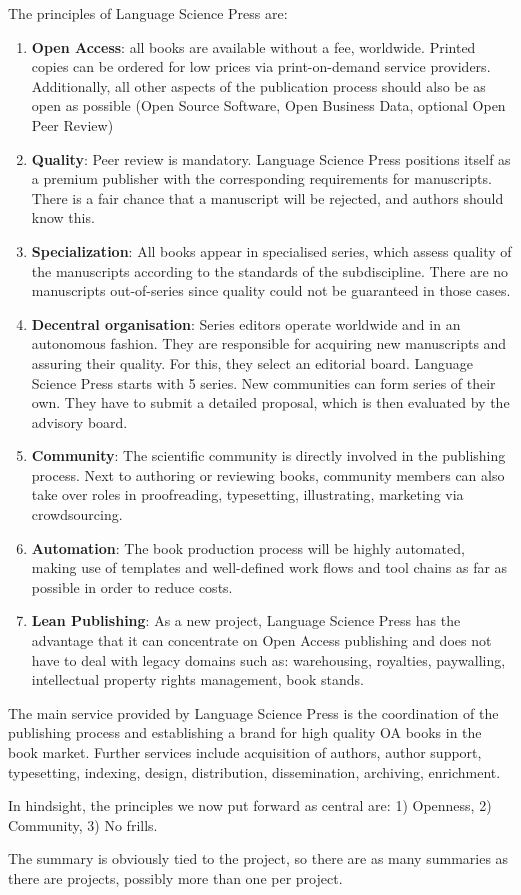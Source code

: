 \documentclass[nonflat,smallfont
]{langsci/langscibook}
\newcommand{\evaluation}[1]{
  \renewcommand{\tblslinecolour}{lsLightOrange}
  \tblssy{receipt}{Evaluation}{\vspace*{-5mm}#1}
}
\newcommand{\othersolutions}[1]{
  \renewcommand{\tblslinecolour}{lsDarkGreenOne}
  \tblssy{more}{Other solutions}{\vspace*{-5mm}#1}
}
\renewcommand{\tblssy}[4][black!12]{%
  \renewcommand{\langscisymbol}{#2}\renewcommand{\tblsboxcolor}{#1}
  \begin{mdframed}[style=yellowexercise,frametitle={#3}]
    #4
  \end{mdframed}
}
\begin{document}
{The principles of Language Science Press are: 
\begin{enumerate}
\sloppy
 \item \textbf{Open Access}: all books are available without a fee, worldwide. Printed copies can be ordered for low prices via print-on-demand service providers. Additionally, all other aspects of the publication process should also be as open as possible (Open Source Software, Open Business Data, optional Open Peer Review)
 \item \textbf{Quality}: Peer review is mandatory. Language Science Press positions itself as a premium publisher with the corresponding requirements for manuscripts. There is a fair chance that a manuscript will be rejected, and authors should know this. 
 \item \textbf{Specialization}: All books appear in specialised series, which assess quality of the manuscripts according to the standards of the subdiscipline. There are no manuscripts out-of-series since quality could not be guaranteed in those cases. 
 \item \textbf{Decentral organisation}: Series editors operate worldwide and in an autonomous fashion. They are responsible for acquiring new manuscripts and assuring their quality. For this, they select an editorial board. Language Science Press starts with 5 series. New communities can form series of their own. They have to submit a detailed proposal, which is then evaluated by the advisory board. 
 \item \textbf{Community}: The scientific community is directly involved in the publishing process. Next to authoring or reviewing books, community members can also take over roles in proofreading, typesetting, illustrating, marketing via crowdsourcing. 
 \item \textbf{Automation}: The book production process will be highly automated, making use of templates and well-defined work flows and tool chains as far as possible in order to reduce costs.  
 \item \textbf{Lean Publishing}: As a new project, Language Science Press has the advantage that it can concentrate on Open Access publishing and does not have to deal with legacy domains such as: warehousing, royalties, paywalling, intellectual property rights management, book stands. 
\end{enumerate}

The main service provided by Language Science Press is the coordination of the publishing process and establishing a brand for high quality OA books in the book market. Further services include acquisition of authors, author support, typesetting, indexing, design, distribution, dissemination, archiving, enrichment. 
}
\evaluation{In hindsight, the principles we now put forward as central are: 1) Openness, 2) Community, 3) No frills.}
\othersolutions{The summary is obviously tied to the project, so there are as many summaries as there are projects, possibly more than one per project. 
}
\end{document}

